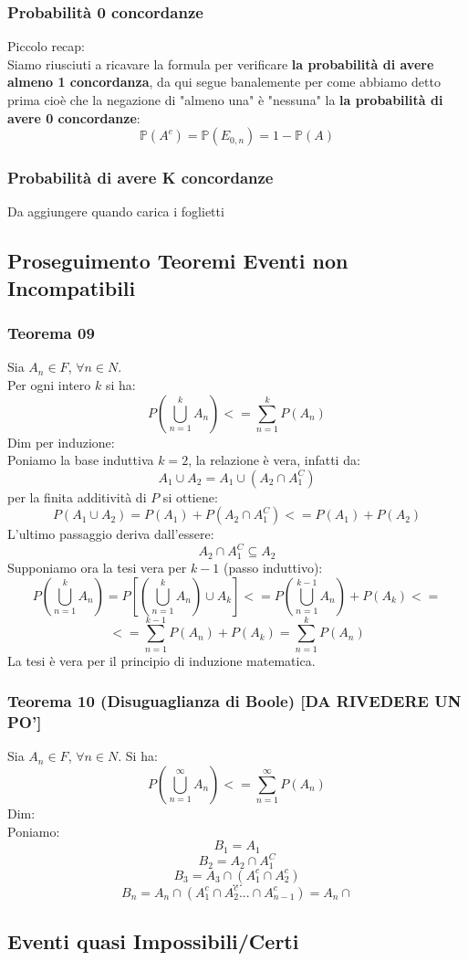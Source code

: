 \subsubsection{Probabilità 0 concordanze}
Piccolo recap:\\
Siamo riusciuti a ricavare la formula per verificare \textbf{la probabilità di avere almeno 1 concordanza}, da qui segue banalemente per come abbiamo detto prima cioè che la negazione di "almeno una" è "nessuna" la \textbf{la probabilità di avere 0 concordanze}:
$$ \mathbb{P}(A^c) = \mathbb{P}(E_{0,n}) = 1 - \mathbb{P}(A) $$

\subsubsection{Probabilità di avere K concordanze}
Da aggiungere quando carica i foglietti

\subsection{Proseguimento Teoremi Eventi non Incompatibili}
\subsubsection{Teorema 09}
Sia $A_n \in F$, $\forall n \in N$.\\
Per ogni intero $k$ si ha:
$$ P(\bigcup_{n=1}^k A_n) <= \sum_{n=1}^k P(A_n) $$
Dim per induzione:\\
Poniamo la base induttiva $k=2$, la relazione è vera, infatti da:
$$ A_1 \cup A_2 = A_1 \cup (A_2 \cap A_1^C) $$
per la finita additività di $P$ si ottiene:
$$ P(A_1 \cup A_2) = P(A_1) + P(A_2 \cap A_1^C) <= P(A_1) + P(A_2) $$
L'ultimo passaggio deriva dall'essere:
$$ A_2 \cap A_1^C \subseteq A_2 $$
Supponiamo ora la tesi vera per $k-1$ (passo induttivo):
$$ P(\bigcup_{n=1}^k A_n) = P[(\bigcup_{n=1}^k A_n) \cup A_k ] <= P(\bigcup_{n=1}^{k-1} A_n)+P(A_k) <= $$
$$ <= \sum_{n=1}^{k-1} P(A_n) + P(A_k) = \sum_{n=1}^k P(A_n)$$
La tesi è vera per il principio di induzione matematica.

\subsubsection{Teorema 10 (Disuguaglianza di Boole) [DA RIVEDERE UN PO']}
Sia $A_n \in F$, $\forall n \in N$. Si ha:
$$  P(\bigcup_{n=1}^{\infty} A_n) <= \sum_{n=1}^{\infty} P(A_n) $$
Dim:\\
Poniamo:
$$ B_1 = A_1 $$
$$ B_2 = A_2 \cap A_1^C $$
$$ B_3 = A_3 \cap (A_1^c \cap A_2^c) $$
$$ ... $$
$$ B_n = A_n \cap (A_1^c \cap A_2^c ... \cap A_{n-1}^c) = A_n \cap $$

\subsection{Eventi quasi Impossibili/Certi}











